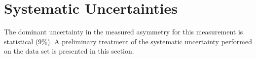 %
%
%
%
%

\section{Systematic Uncertainties}
\label{Systematic Uncertainties}
The dominant uncertainty in the measured asymmetry for this measurement is statistical (9\%). A preliminary treatment of the systematic uncertainty performed on the data set is presented in this section.

